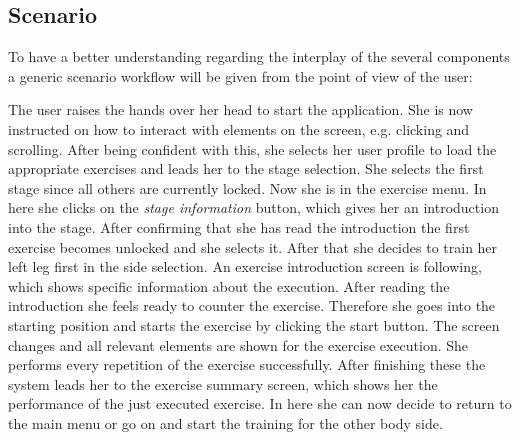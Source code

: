 \subsection{Scenario}\label{4_1_7_requirements_scenario}
To have a better understanding regarding the interplay of the several components a generic scenario workflow will be given from the point of view of the user:

The user raises the hands over her head to start the application. She is now instructed on how to interact with elements on  the screen, e.g. clicking and scrolling. After being confident with this, she selects her user profile to load the appropriate exercises and leads her to the stage selection. She selects the first stage since all others are currently locked. Now she is in the exercise menu. In here she clicks on the \textit{stage information} button, which gives her an introduction into the stage. After confirming that she has read the introduction the first exercise becomes unlocked and she selects it. After that she decides to train her left leg first in the side selection. An exercise introduction screen is following, which shows specific information about the execution. After reading the introduction she feels ready to counter the exercise. Therefore she goes into the starting position and starts the exercise by clicking the start button. The screen changes and all relevant elements are shown for the exercise execution. She performs every repetition of the exercise successfully. After finishing these the system leads her to the exercise summary screen, which shows her the performance of the just executed exercise. In here she can now decide to return to the main menu or go on and start the training for the other body side.

